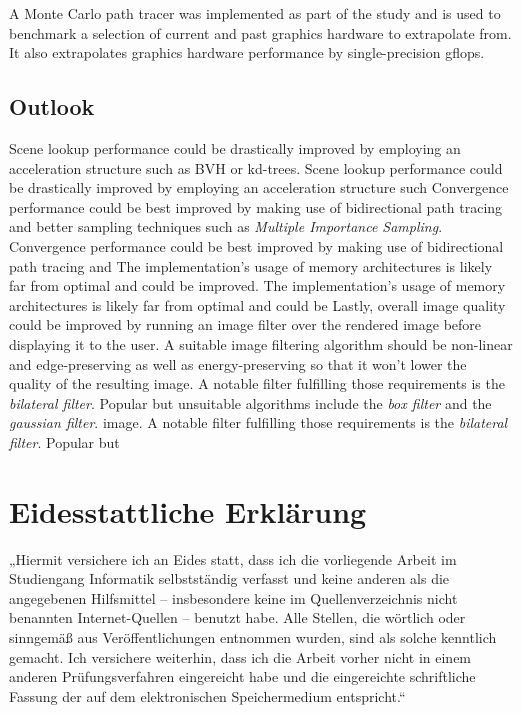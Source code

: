 \documentclass[
  twoside,
  11pt, a4paper,
  footinclude=true,
  headinclude=true,
  cleardoublepage=empty
]{scrreprt}
\begin{document}
A Monte Carlo path tracer was implemented as part of the study and is used to benchmark a selection
of current and past graphics hardware to extrapolate from. It also extrapolates graphics hardware
performance by single-precision \ac{gflops}. 

\section{Outlook}
Scene lookup performance could be drastically improved by employing an acceleration structure such
as BVH or kd-trees.
Scene lookup performance could be drastically improved by employing an acceleration structure such
Convergence performance could be best improved by making use of bidirectional path tracing and
better sampling techniques such as \textit{Multiple Importance Sampling}.
Convergence performance could be best improved by making use of bidirectional path tracing and
The implementation's usage of memory architectures is likely far from optimal and could be
improved.
The implementation's usage of memory architectures is likely far from optimal and could be
Lastly, overall image quality could be improved by running an image filter over the rendered image
before displaying it to the user. A suitable image filtering algorithm should be non-linear and
edge-preserving as well as energy-preserving so that it won't lower the quality of the resulting
image. A notable filter fulfilling those requirements is the \textit{bilateral filter}. Popular but
unsuitable algorithms include the \textit{box filter} and the \textit{gaussian filter}.
image. A notable filter fulfilling those requirements is the \textit{bilateral filter}. Popular but
\listoffigures
\listoflistings
\listoftables



\chapter*{Eidesstattliche Erklärung}
\onehalfspace
„Hiermit versichere ich an Eides statt, dass ich die vorliegende Arbeit im
Studiengang Informatik selbstständig verfasst und keine anderen als die
angegebenen Hilfsmittel – insbesondere keine im Quellenverzeichnis nicht
benannten Internet-Quellen – benutzt habe. Alle Stellen, die wörtlich oder
sinngemäß aus Veröffentlichungen entnommen wurden, sind als solche kenntlich
gemacht. Ich versichere weiterhin, dass ich die Arbeit vorher nicht in einem
anderen Prüfungsverfahren eingereicht habe und die eingereichte schriftliche
Fassung der auf dem elektronischen Speichermedium entspricht.“
\singlespace
\end{document}

